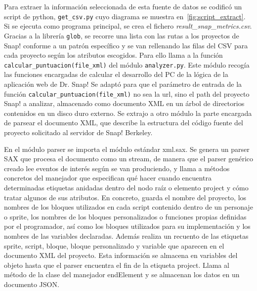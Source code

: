 \documentclass[a4paper, 12pt]{book}
\begin{document}
Para extraer la información seleccionada de esta fuente de datos se codificó un script de python, \texttt{get\_csv.py} cuyo diagrama se muestra en~\ref{fig:script_extract}. Si se ejecuta como programa principal, se crea el fichero \emph{result\_snap\_metrics.csv}. Gracias a la librería \texttt{glob}, se recorre una lista con las rutas a los proyectos de Snap! conforme a un patrón específico y se van rellenando las filas del CSV para cada proyecto según los atributos escogidos. Para ello llama a la función \texttt{calcular\_puntuacion(file\_xml)} del módulo \texttt{analyzer.py}. Este módulo recogía las funciones encargadas de calcular el desarrollo del PC de la lógica de la aplicación web de Dr. Snap! Se adaptó para que el parámetro de entrada de la función \texttt{calcular\_puntuacion(file\_xml)} no sea la url, sino el path del proyecto Snap! a analizar, almacenado como documento XML en un árbol de directorios contenidos en un disco duro externo. Se extrajo a otro módulo la parte encargada de parsear el documento XML, que describe la estructura del código fuente del proyecto solicitado al servidor de Snap! Berkeley. 

En el módulo parser se importa el módulo estándar xml.sax. Se genera un parser SAX que procesa el documento como un stream, de manera que el parser genérico creado lee eventos de interés según se van produciendo, y llama a métodos concretos del manejador que especifican qué hacer cuando encuentra determinadas etiquetas anidadas dentro del nodo raíz o elemento project y cómo tratar algunos de sus atributos. En concreto, guarda el nombre del proyecto, los nombres de los bloques utilizados en cada script contenido dentro de un personaje o sprite, los nombres de los bloques personalizados o funciones propias definidas por el programador, así como los bloques utilizados para su implementación y los nombres de las variables declaradas. Además realiza un recuento de las etiquetas sprite, script, bloque, bloque personalizado y variable que aparecen en el documento XML del proyecto. Esta información se almacena en variables del objeto hasta que el parser encuentra el fin de la etiqueta project. Llama al método de la clase del manejador endElement y se almacenan los datos en un documento JSON.
\end{document}
